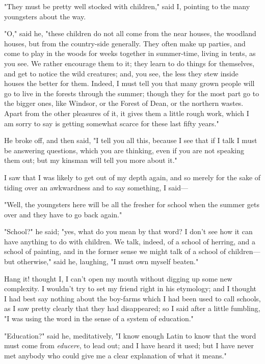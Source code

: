 "They must be pretty well stocked with children," said I, pointing to
the many youngsters about the way.

"O," said he, "these children do not all come from the near houses, the
woodland houses, but from the country-side generally. They often make up
parties, and come to play in the woods for weeks together in
summer-time, living in tents, as you see. We rather encourage them to
it; they learn to do things for themselves, and get to notice the wild
creatures; and, you see, the less they stew inside houses the better for
them. Indeed, I must tell you that many grown people will go to live in
the forests through the summer; though they for the most part go to the
bigger ones, like Windsor, or the Forest of Dean, or the northern
wastes. Apart from the other pleasures of it, it gives them a little
rough work, which I am sorry to say is getting somewhat scarce for these
last fifty years."

He broke off, and then said, "I tell you all this, because I see that if
I talk I must be answering questions, which you are thinking, even if
you are not speaking them out; but my kinsman will tell you more about
it."

I saw that I was likely to get out of my depth again, and so merely for
the sake of tiding over an awkwardness and to say something, I said---

"Well, the youngsters here will be all the fresher for school when the
summer gets over and they have to go back again."

"School?" he said; "yes, what do you mean by that word? I don't see how
it can have anything to do with children. We talk, indeed, of a school
of herring, and a school of painting, and in the former sense we might
talk of a school of children---but otherwise," said he, laughing, "I
must own myself beaten."

Hang it! thought I, I can't open my mouth without digging up some new
complexity. I wouldn't try to set my friend right in his etymology; and
I thought I had best say nothing about the boy-farms which I had been
used to call schools, as I saw pretty clearly that they had disappeared;
so I said after a little fumbling, "I was using the word in the sense of
a system of education."

"Education?" said he, meditatively, "I know enough Latin to know that
the word must come from \emph{educere}, to lead out; and I have heard it
used; but I have never met anybody who could give me a clear explanation
of what it means."

